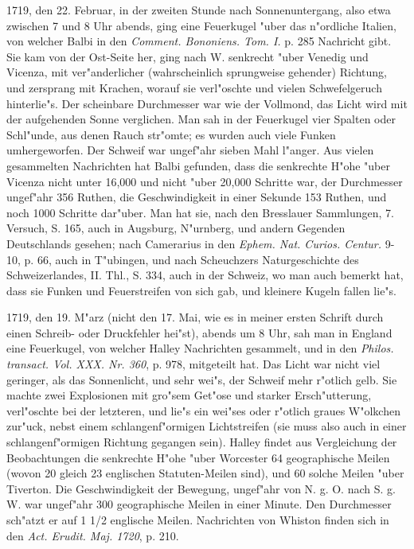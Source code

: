\documentclass[a4paper, 11pt, oneside, polutonikogreek, german]{article}
\begin{document}
1719, den 22. Februar, in der zweiten Stunde nach Sonnenuntergang, also etwa zwischen 7 und 8 Uhr abends, ging eine Feuerkugel "uber das n"ordliche Italien, von welcher Balbi in den \emph{Comment. Bononiens. Tom. I.} p. 285 Nachricht gibt. Sie kam von der Ost-Seite her, ging nach W. senkrecht "uber Venedig und Vicenza, mit ver"anderlicher (wahrscheinlich sprungweise gehender) Richtung, und zersprang mit Krachen, worauf sie verl"oschte und vielen Schwefelgeruch hinterlie"s. Der scheinbare Durchmesser war wie der Vollmond, das Licht wird mit der aufgehenden Sonne verglichen. Man sah in der Feuerkugel vier Spalten oder Schl"unde, aus denen Rauch str"omte; es wurden auch viele Funken umhergeworfen. Der Schweif war ungef"ahr sieben Mahl l"anger. Aus vielen gesammelten Nachrichten hat Balbi gefunden, dass die senkrechte H"ohe "uber Vicenza nicht unter 16,000 und nicht "uber 20,000 Schritte war, der Durchmesser ungef"ahr 356 Ruthen, die Geschwindigkeit in einer Sekunde 153 Ruthen, und noch 1000 Schritte dar"uber. Man hat sie, nach den Bresslauer Sammlungen, 7. Versuch, S. 165, auch in Augsburg, N"urnberg, und andern Gegenden Deutschlands gesehen; nach Camerarius in den \emph{Ephem. Nat. Curios. Centur.} 9-10, p. 66, auch in T"ubingen, und nach Scheuchzers Naturgeschichte des Schweizerlandes, II. Thl., S. 334, auch in der Schweiz, wo man auch bemerkt hat, dass sie Funken und Feuerstreifen von sich gab, und kleinere Kugeln fallen lie"s.

1719, den 19. M"arz (nicht den 17. Mai, wie es in meiner ersten Schrift durch einen Schreib- oder Druckfehler hei"st), abends um 8 Uhr, sah man in England eine Feuerkugel, von welcher Halley Nachrichten gesammelt, und in den \emph{Philos. transact. Vol. XXX. Nr. 360}, p. 978, mitgeteilt hat. Das Licht war nicht viel geringer, als das Sonnenlicht, und sehr wei"s, der Schweif mehr r"otlich gelb. Sie machte zwei Explosionen mit gro"sem Get"ose und starker Ersch"utterung, verl"oschte bei der letzteren, und lie"s ein wei"ses oder r"otlich graues W"olkchen zur"uck, nebst einem schlangenf"ormigen Lichtstreifen (sie muss also auch in einer schlangenf"ormigen Richtung gegangen sein). Halley findet aus Vergleichung der Beobachtungen die senkrechte H"ohe "uber Worcester 64 geographische Meilen (wovon 20 gleich 23 englischen Statuten-Meilen sind), und 60 solche Meilen "uber Tiverton. Die Geschwindigkeit der Bewegung, ungef"ahr von N. g. O. nach S. g. W. war ungef"ahr 300 geographische Meilen in einer Minute. Den Durchmesser sch"atzt er auf 1 1/2 englische Meilen. Nachrichten von Whiston finden sich in den \emph{Act. Erudit. Maj. 1720}, p. 210.
\end{document}
